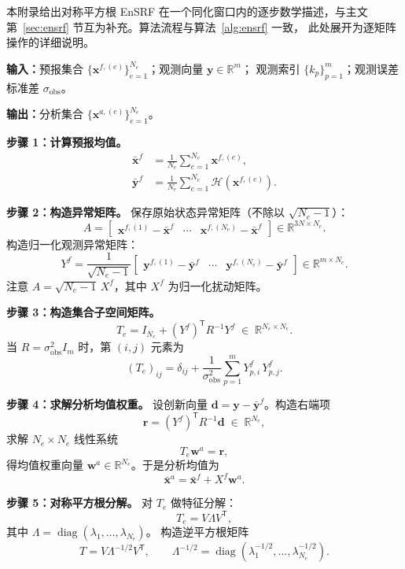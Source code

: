 \documentclass[12pt,a4paper]{article}
\newcommand{\x}{\bm{x}}
\newcommand{\y}{\bm{y}}
\newcommand{\w}{\bm{w}}
\newcommand{\T}{^{\mathsf T}}
\newcommand{\R}{\mathbb{R}}
\newcommand{\calH}{\mathcal{H}}
\begin{document}
本附录给出对称平方根 EnSRF 在一个同化窗口内的逐步数学描述，与主文
第~\ref{sec:ensrf} 节互为补充。算法流程与算法~\ref{alg:ensrf} 一致，
此处展开为逐矩阵操作的详细说明。

\medskip\noindent
\textbf{输入：}预报集合 $\{\x^{f,(e)}\}_{e=1}^{N_e}$；观测向量 $\y \in \R^m$；
观测索引 $\{k_p\}_{p=1}^{m}$；观测误差标准差 $\sigma_{\mathrm{obs}}$。

\medskip\noindent
\textbf{输出：}分析集合 $\{\x^{a,(e)}\}_{e=1}^{N_e}$。

\medskip\noindent
\textbf{步骤 1：计算预报均值。}
\begin{align*}
  \bar{\x}^f &= \frac{1}{N_e}\sum_{e=1}^{N_e} \x^{f,(e)}, \\
  \bar{\y}^f &= \frac{1}{N_e}\sum_{e=1}^{N_e} \calH(\x^{f,(e)}).
\end{align*}

\medskip\noindent
\textbf{步骤 2：构造异常矩阵。}
保存原始状态异常矩阵（不除以 $\sqrt{N_e-1}$）：
\[
  A = \begin{bmatrix}
    \x^{f,(1)} - \bar{\x}^f & \cdots & \x^{f,(N_e)} - \bar{\x}^f
  \end{bmatrix} \in \R^{3N \times N_e}.
\]
构造归一化观测异常矩阵：
\[
  Y^f = \frac{1}{\sqrt{N_e-1}}
  \begin{bmatrix}
    \y^{f,(1)} - \bar{\y}^f & \cdots & \y^{f,(N_e)} - \bar{\y}^f
  \end{bmatrix} \in \R^{m \times N_e}.
\]
注意 $A = \sqrt{N_e-1}\,X^f$，其中 $X^f$ 为归一化扰动矩阵。

\medskip\noindent
\textbf{步骤 3：构造集合子空间矩阵。}
\[
  T_e = I_{N_e} + (Y^f)\T R^{-1} Y^f \;\in\; \R^{N_e \times N_e}.
\]
当 $R = \sigma_{\mathrm{obs}}^2 I_m$ 时，第 $(i,j)$ 元素为
\[
  (T_e)_{ij} = \delta_{ij} + \frac{1}{\sigma_{\mathrm{obs}}^2}
  \sum_{p=1}^{m} Y^f_{p,i}\,Y^f_{p,j}.
\]

\medskip\noindent
\textbf{步骤 4：求解分析均值权重。}
设创新向量 $\mathbf{d} = \y - \bar{\y}^f$。构造右端项
\[
  \mathbf{r} = (Y^f)\T R^{-1} \mathbf{d} \;\in\; \R^{N_e},
\]
求解 $N_e \times N_e$ 线性系统
\[
  T_e \w^a = \mathbf{r},
\]
得均值权重向量 $\w^a \in \R^{N_e}$。于是分析均值为
\[
  \bar{\x}^a = \bar{\x}^f + X^f \w^a.
\]

\medskip\noindent
\textbf{步骤 5：对称平方根分解。}
对 $T_e$ 做特征分解：
\[
  T_e = V \Lambda V\T,
\]
其中 $\Lambda = \operatorname{diag}(\lambda_1, \dots, \lambda_{N_e})$。
构造逆平方根矩阵
\[
  T = V \Lambda^{-1/2} V\T,
  \qquad
  \Lambda^{-1/2} = \operatorname{diag}(\lambda_1^{-1/2}, \dots,
                                         \lambda_{N_e}^{-1/2}).
\]
\end{document}
